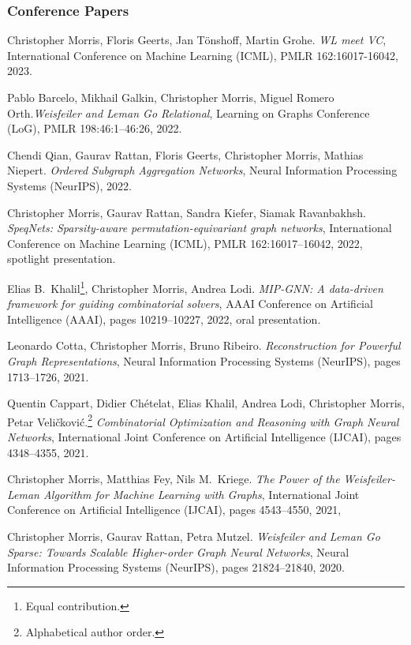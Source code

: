 \documentclass[10pt, a4paper, DIV=14, headings=small]{scrartcl}
\begin{document}
\begin{thebibliography}{15}

	\subsubsection*{Conference Papers}
	Christopher Morris, Floris Geerts, Jan Tönshoff, Martin Grohe.
	\emph{WL meet VC},
	International Conference on Machine Learning (ICML), PMLR 162:16017-16042, 2023.
	
	Pablo Barcelo, Mikhail Galkin, Christopher Morris, Miguel Romero Orth.\footnotemark[2]
	\emph{Weisfeiler and Leman Go Relational},
	Learning on Graphs Conference (LoG), PMLR 198:46:1--46:26, 2022.

	Chendi Qian, Gaurav Rattan, Floris Geerts, Christopher Morris, Mathias Niepert.
	\emph{Ordered Subgraph Aggregation Networks},
	Neural Information Processing Systems (NeurIPS), 2022.

	Christopher Morris, Gaurav Rattan, Sandra Kiefer, Siamak Ravanbakhsh.
	\emph{SpeqNets: Sparsity-aware permutation-equivariant graph networks},
	International Conference on Machine Learning (ICML), PMLR 162:16017--16042, 2022, spotlight presentation.

	Elias B.\, Khalil\footnote{Equal contribution.}, Christopher Morris{\footnotemark[1]}, Andrea Lodi.
	\emph{MIP-GNN: A data-driven framework for guiding combinatorial solvers},
	AAAI Conference on Artificial Intelligence (AAAI), pages 10219--10227, 2022, oral presentation.

	Leonardo Cotta, Christopher Morris, Bruno Ribeiro.
	\emph{Reconstruction for Powerful Graph Representations},
	Neural Information Processing Systems (NeurIPS), pages 1713--1726, 2021.

	Quentin Cappart, Didier Chételat, Elias Khalil, Andrea Lodi, Christopher Morris, Petar Veli\v{c}kovi\'{c}.\footnote{Alphabetical author order.}
	\emph{Combinatorial Optimization and Reasoning with Graph Neural Networks},
	International Joint Conference on Artificial Intelligence (IJCAI), pages 4348--4355, 2021.

	Christopher Morris, Matthias Fey, Nils M.~Kriege.
	\emph{The Power of the Weisfeiler-Leman Algorithm for Machine Learning with Graphs},
	International Joint Conference on Artificial Intelligence (IJCAI), pages 4543--4550, 2021,

	Christopher Morris, Gaurav Rattan, Petra Mutzel.
	\emph{Weisfeiler and Leman Go Sparse: Towards Scalable Higher-order Graph Neural Networks},
	Neural Information Processing Systems (NeurIPS), pages 21824--21840, 2020.


\end{thebibliography}
\end{document}
